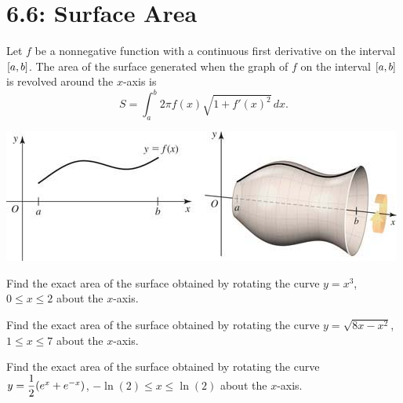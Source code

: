 \documentclass[../mathNotesPreamble]{subfiles}
\begin{document}
  \section{6.6: Surface Area}

  \begin{defn*}
    Let $f$ be a nonnegative function with a continuous first derivative on the interval ${\left[a,b\right]}$. The area of the surface generated when the graph of $f$ on the interval ${\left[a,b\right]}$ is revolved around the $x$-axis is
      \[S=\int_a^b 2\pi f(x)\sqrt{1+f'(x)^2}\,dx.\]
  \end{defn*}

  \begin{center}
    \includegraphics[width=0.5\linewidth]{../images/briggs_06_06/fig06_60}
  \end{center}

  \begin{ex*}
    Find the exact area of the surface obtained by rotating the curve $y=x^3$, $0\leq x\leq 2$ about the $x$-axis.
  \end{ex*}
  \pagebreak

  \begin{ex*}
    Find the exact area of the surface obtained by rotating the curve $y=\sqrt{8x-x^2}$, $1\leq x\leq 7$ about the $x$-axis.
  \end{ex*}
  \pagebreak

  \begin{ex*}
    Find the exact area of the surface obtained by rotating the curve $y=\dfrac{1}{2}{\left(e^{x}+e^{-x}\right)}$, $-\ln(2)\leq x\leq \ln(2)$ about the $x$-axis.
  \end{ex*}
  \pagebreak

  
\end{document}
